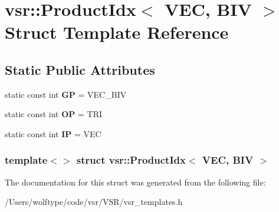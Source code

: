 \hypertarget{structvsr_1_1_product_idx_3_01_v_e_c_00_01_b_i_v_01_4}{\section{vsr\-:\-:Product\-Idx$<$ V\-E\-C, B\-I\-V $>$ Struct Template Reference}
\label{structvsr_1_1_product_idx_3_01_v_e_c_00_01_b_i_v_01_4}
}
\subsection*{Static Public Attributes}
\begin{DoxyCompactItemize}
\item 
\hypertarget{structvsr_1_1_product_idx_3_01_v_e_c_00_01_b_i_v_01_4_a1c9cc3a19a31c03b8ff4887980c1c55c}{static const int {\bfseries G\-P} = V\-E\-C\-\_\-\-B\-I\-V}\label{structvsr_1_1_product_idx_3_01_v_e_c_00_01_b_i_v_01_4_a1c9cc3a19a31c03b8ff4887980c1c55c}

\item 
\hypertarget{structvsr_1_1_product_idx_3_01_v_e_c_00_01_b_i_v_01_4_aba01b0447122a23537e79a63e6993322}{static const int {\bfseries O\-P} = T\-R\-I}\label{structvsr_1_1_product_idx_3_01_v_e_c_00_01_b_i_v_01_4_aba01b0447122a23537e79a63e6993322}

\item 
\hypertarget{structvsr_1_1_product_idx_3_01_v_e_c_00_01_b_i_v_01_4_a690b8eddd0af2ad1b4a343aeb155f679}{static const int {\bfseries I\-P} = V\-E\-C}\label{structvsr_1_1_product_idx_3_01_v_e_c_00_01_b_i_v_01_4_a690b8eddd0af2ad1b4a343aeb155f679}

\end{DoxyCompactItemize}
\subsubsection*{template$<$$>$ struct vsr\-::\-Product\-Idx$<$ V\-E\-C, B\-I\-V $>$}



The documentation for this struct was generated from the following file\-:\begin{DoxyCompactItemize}
\item 
/\-Users/wolftype/code/vsr/\-V\-S\-R/vsr\-\_\-templates.\-h\end{DoxyCompactItemize}

